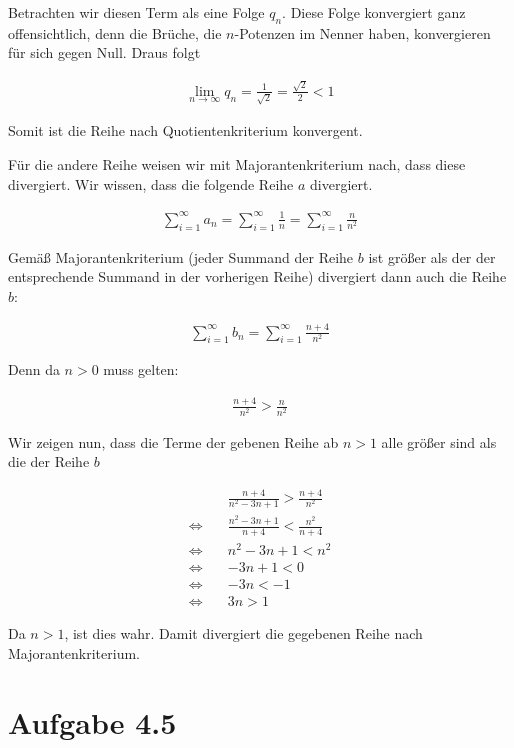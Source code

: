 \documentclass[a4paper,german,12pt,smallheadings]{scrartcl}
\begin{document}
Betrachten wir diesen Term als eine Folge $q_n$. Diese Folge konvergiert ganz
offensichtlich, denn die Brüche, die $n$-Potenzen im Nenner haben, konvergieren
für sich gegen Null. Draus folgt

\begin{align*}
  \lim_{n \to \infty} q_n = \frac{1}{\sqrt{2}} = \frac{\sqrt{2}}{2} < 1
\end{align*}

Somit ist die Reihe nach Quotientenkriterium konvergent.

Für die andere Reihe weisen wir mit Majorantenkriterium nach, dass diese divergiert. Wir wissen, dass die folgende Reihe $a$ divergiert.

\begin{align*}
  \sum_{i=1}^\infty a_n = \sum_{i=1}^\infty  \frac{1}{n} = \sum_{i=1}^\infty \frac{n}{n^2}
\end{align*}

Gemäß Majorantenkriterium (jeder Summand der Reihe $b$ ist größer als der der
entsprechende Summand in der vorherigen Reihe) divergiert dann auch die Reihe $b$:

\begin{align*}
  \sum_{i=1}^\infty b_n = \sum_{i=1}^\infty  \frac{n+4}{n^2}
\end{align*}

Denn da $n>0$ muss gelten:

\begin{align*}
  \frac{n+4}{n^2} > \frac{n}{n^2}
\end{align*}

Wir zeigen nun, dass die Terme der gebenen Reihe ab $n > 1$ alle größer sind
als die der Reihe $b$

\begin{align*}
 &\frac{n+4}{n^2-3n+1} > \frac{n+4}{n^2} \\
 \Leftrightarrow\quad& \frac{n^2-3n+1}{n+4} < \frac{n^2}{n+4} \\
 \Leftrightarrow\quad& n^2-3n+1 < n^2 \\
 \Leftrightarrow\quad& -3n+1 < 0 \\
 \Leftrightarrow\quad& -3n < -1 \\
 \Leftrightarrow\quad& 3n > 1
\end{align*}

Da $n > 1$, ist dies wahr. Damit divergiert die gegebenen Reihe nach Majorantenkriterium.

\section*{Aufgabe 4.5}
\end{document}

